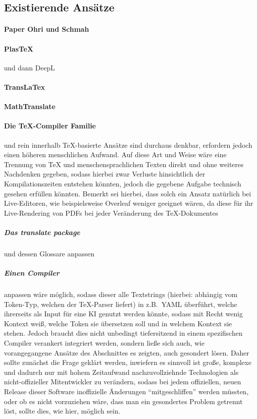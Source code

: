 \subsection{Existierende Ansätze}

\paragraph*{Paper Ohri und Schmah}
\paragraph*{PlasTeX} und dann DeepL
\paragraph*{TransLaTex}
\paragraph*{MathTranslate}


\paragraph*{Die \TeX{}-Compiler Familie} und rein innerhalb \TeX{}-basierte Ansätze sind durchaus denkbar, erfordern jedoch einen höheren menschlichen Aufwand. Auf diese Art und Weise wäre eine Trennung von \TeX{} und menschensprachlichen Texten direkt und ohne weiteres Nachdenken gegeben, sodass hierbei zwar Verluste hinsichtlich der Kompilationszeiten entstehen könnten, jedoch die gegebene Aufgabe technisch gesehen erfüllen könnten. Bemerkt sei hierbei, dass solch ein Ansatz natürlich bei Live-Editoren, wie beispielsweise Overleaf weniger geeignet wären, da diese für ihr Live-Rendering von PDFs bei jeder Veränderung des \TeX{}-Dokumentes 
\subparagraph*{Das translate package} und dessen Glossare anpassen
\subparagraph*{Einen Compiler} anpassen wäre möglich, sodass dieser alle Textstrings (hierbei: abhängig vom Token-Typ, welchen der \TeX{}-Parser liefert) in z.B.\ YAML überführt, welche ihrerseits als Input für eine KI genutzt werden könnte, sodass mit Recht wenig Kontext weiß, welche Token sie übersetzen soll und in welchem Kontext sie stehen. Jedoch braucht dies nicht unbedingt tiefersitzend in einem spezifischen Compiler verankert integriert werden, sondern ließe sich auch, wie vorangegangene Ansätze des Abschnittes es zeigten, auch gesondert lösen. Daher sollte zunächst die Frage geklärt werden, inwiefern es sinnvoll ist große, komplexe und dadurch nur mit hohem Zeitaufwand nachzuvollziehnde Technologien als nicht-offizieller Mitentwickler zu verändern, sodass bei jedem offiziellen, neuen Release dieser Software inoffizielle Änderungen \enquote{mitgeschliffen} werden müssten, oder ob es nicht vorzuziehen wäre, dass man ein gesondertes Problem getrennt löst, sollte dies, wie hier, möglich sein.%

